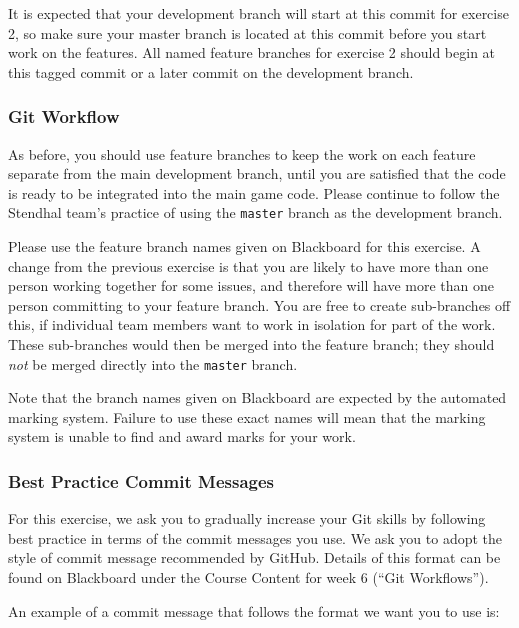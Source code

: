 \documentclass[
]{book}
\begin{document}
It is expected that your development branch will start at this commit for exercise 2, so make sure your master branch is located at this commit before you start work on the features. All named feature branches for exercise 2 should begin at this tagged commit or a later commit on the development branch.

\hypertarget{gitworkflow}{%
\subsubsection*{Git Workflow}\label{gitworkflow}}

As before, you should use feature branches to keep the work on each feature separate from the main development branch, until you are satisfied that the code is ready to be integrated into the main game code. Please continue to follow the Stendhal team's practice of using the \texttt{master} branch as the development branch.

Please use the feature branch names given on Blackboard for this exercise. A change from the previous exercise is that you are likely to have more than one person working together for some issues, and therefore will have more than one person committing to your feature branch. You are free to create sub-branches off this, if individual team members want to work in isolation for part of the work. These sub-branches would then be merged into the feature branch; they should \emph{not} be merged directly into the \texttt{master} branch.

Note that the branch names given on Blackboard are expected by the automated marking system. Failure to use these exact names will mean that the marking system is unable to find and award marks for your work.

\hypertarget{bpcm}{%
\subsubsection*{Best Practice Commit Messages}\label{bpcm}}

For this exercise, we ask you to gradually increase your Git skills by following best practice in terms of the commit messages you use. We ask you to adopt the style of commit message recommended by GitHub. Details of this format can be found on Blackboard under the Course Content for week 6 (``Git Workflows'').

An example of a commit message that follows the format we want you to use is:
\end{document}
